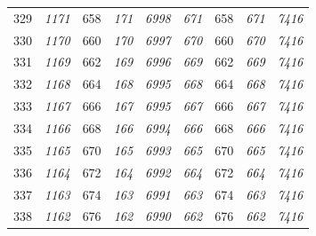\documentclass[10pt,fleqn]{article}
\begin{document}
\begin{longtable}{c|cccccccc}
329 & {\color{blue} \it 1171 \rm} & {\color{black} 658} & {\color{blue} \it 171 \rm} & {\color{blue} \it 6998 \rm} & {\color{blue} \it 671 \rm} & {\color{black} 658} & {\color{blue} \it 671 \rm} & {\color{blue} \it 7416 \rm} \\
330 & {\color{blue} \it 1170 \rm} & {\color{black} 660} & {\color{blue} \it 170 \rm} & {\color{blue} \it 6997 \rm} & {\color{blue} \it 670 \rm} & {\color{black} 660} & {\color{blue} \it 670 \rm} & {\color{blue} \it 7416 \rm} \\
331 & {\color{blue} \it 1169 \rm} & {\color{black} 662} & {\color{blue} \it 169 \rm} & {\color{blue} \it 6996 \rm} & {\color{blue} \it 669 \rm} & {\color{black} 662} & {\color{blue} \it 669 \rm} & {\color{blue} \it 7416 \rm} \\
332 & {\color{blue} \it 1168 \rm} & {\color{black} 664} & {\color{blue} \it 168 \rm} & {\color{blue} \it 6995 \rm} & {\color{blue} \it 668 \rm} & {\color{black} 664} & {\color{blue} \it 668 \rm} & {\color{blue} \it 7416 \rm} \\
333 & {\color{blue} \it 1167 \rm} & {\color{black} 666} & {\color{blue} \it 167 \rm} & {\color{blue} \it 6995 \rm} & {\color{blue} \it 667 \rm} & {\color{black} 666} & {\color{blue} \it 667 \rm} & {\color{blue} \it 7416 \rm} \\
334 & {\color{blue} \it 1166 \rm} & {\color{black} 668} & {\color{blue} \it 166 \rm} & {\color{blue} \it 6994 \rm} & {\color{blue} \it 666 \rm} & {\color{black} 668} & {\color{blue} \it 666 \rm} & {\color{blue} \it 7416 \rm} \\
335 & {\color{blue} \it 1165 \rm} & {\color{black} 670} & {\color{blue} \it 165 \rm} & {\color{blue} \it 6993 \rm} & {\color{blue} \it 665 \rm} & {\color{black} 670} & {\color{blue} \it 665 \rm} & {\color{blue} \it 7416 \rm} \\
336 & {\color{blue} \it 1164 \rm} & {\color{black} 672} & {\color{blue} \it 164 \rm} & {\color{blue} \it 6992 \rm} & {\color{blue} \it 664 \rm} & {\color{black} 672} & {\color{blue} \it 664 \rm} & {\color{blue} \it 7416 \rm} \\
337 & {\color{blue} \it 1163 \rm} & {\color{black} 674} & {\color{blue} \it 163 \rm} & {\color{blue} \it 6991 \rm} & {\color{blue} \it 663 \rm} & {\color{black} 674} & {\color{blue} \it 663 \rm} & {\color{blue} \it 7416 \rm} \\
338 & {\color{blue} \it 1162 \rm} & {\color{black} 676} & {\color{blue} \it 162 \rm} & {\color{blue} \it 6990 \rm} & {\color{blue} \it 662 \rm} & {\color{black} 676} & {\color{blue} \it 662 \rm} & {\color{blue} \it 7416 \rm} \\

\end{longtable}
\end{document}
